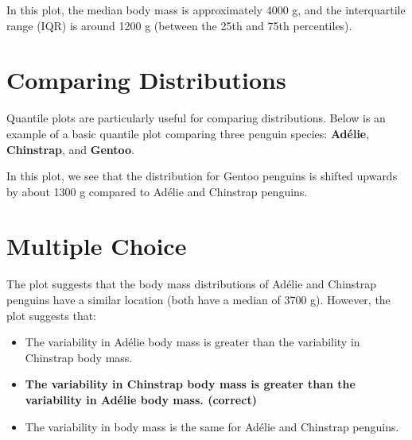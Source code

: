 \documentclass{article}
\begin{document}
In this plot, the median body mass is approximately 4000 g, and the interquartile range (IQR) is around 1200 g (between the 25th and 75th percentiles).

\section*{Comparing Distributions}

Quantile plots are particularly useful for comparing distributions. Below is an example of a basic quantile plot comparing three penguin species: \textbf{Adélie}, \textbf{Chinstrap}, and \textbf{Gentoo}.

\begin{center}
\end{center}

In this plot, we see that the distribution for Gentoo penguins is shifted upwards by about 1300 g compared to Adélie and Chinstrap penguins.

\section*{Multiple Choice}

The plot suggests that the body mass distributions of Adélie and Chinstrap penguins have a similar location (both have a median of 3700 g). However, the plot suggests that:

\begin{itemize}
    \item The variability in Adélie body mass is greater than the variability in Chinstrap body mass.
    \item \textbf{The variability in Chinstrap body mass is greater than the variability in Adélie body mass. (correct)}
    \item The variability in body mass is the same for Adélie and Chinstrap penguins.
\end{itemize}
\end{document}
